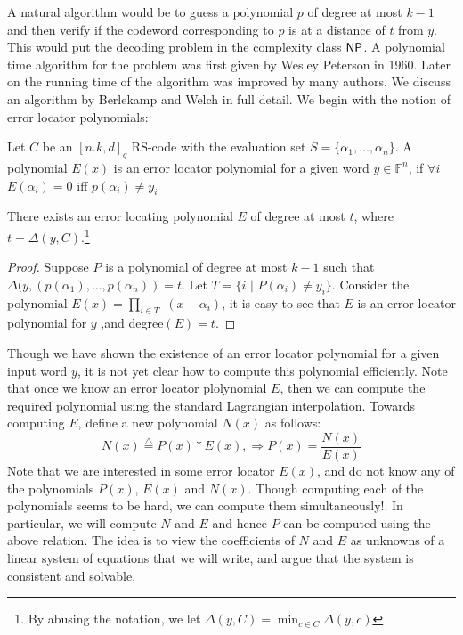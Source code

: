 A natural algorithm would be to guess a polynomial $p$ of degree at most $k-1$ and then verify if the codeword corresponding to $p$ is at a distance of 
$t$ from $y$. This would put the decoding problem in the complexity class ${\sf NP}$. A polynomial time algorithm for the problem was first  given by Wesley Peterson in 1960. 
Later on the running time of the algorithm was  improved by many authors. We discuss an algorithm by Berlekamp and Welch in full detail. We begin with the notion of error locator polynomials:
\begin{definition}
Let $C$ be an $[n.k,d]_q$ RS-code with the evaluation set $S=\{\alpha_1,\ldots, \alpha_n\}$. A polynomial 
$E(x)$ is an error locator  polynomial for a given word $y\in {\mathbb F}^n$, if $\forall i$ $E(\alpha_{i})=0$ iff $p(\alpha_{i})\neq y_{i}$
\end{definition}
\begin{lemma}
 There exists an  error locating polynomial $E$ of degree at most $t$, where $t= \Delta(y, C)$.\footnote{By abusing the notation, we let $\Delta(y,C)=\min_{c\in C}\Delta(y,c)$}
\end{lemma}
\begin{proof}
Suppose $P$ is a  polynomial of degree at most  $k-1$ such that $ \Delta(y, (p(\alpha_1),\ldots, p(\alpha_n)) =t$.  
 Let $T = \{i$ $|$ $P(\alpha_{i})\neq y_{i}\}$. Consider the polynomial $E(x) = \prod_{i\in T}$ $(x-\alpha_{i})$, it is easy to see that $E$ is an error locator polynomial for $y$ ,and 
degree$(E) =t$.
\end{proof}

Though we have shown the existence of an error locator polynomial for a given input word $y$, it is not yet clear how to compute this polynomial efficiently.  Note that once we know an error locator plolynomial $E$, then we can 
compute the required polynomial using the standard Lagrangian interpolation.  Towards computing $E$, define a new polynomial $N(x)$ as follows: 
\[
 N(x)\stackrel{\triangle}{=}P(x)*E(x) , \Longrightarrow P(x)=\dfrac{N(x)}{E(x)}
\]
 Note that we are interested in some error locator $E(x)$,  and  do not know  any of the polynomials $P(x)$, $E(x)$ and $N(x)$.  Though computing each of the polynomials seems to be hard, we can compute them simultaneously!. In particular, we will compute $N$ and $E$ and hence $P$ can be computed using the above relation. The idea is to view the coefficients of $N$ and $E$ as unknowns of a linear system of equations that we will write, and argue that the system is consistent and solvable.
 

